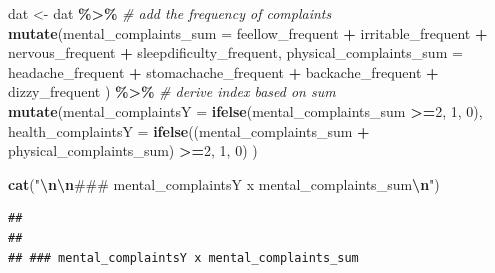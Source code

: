\documentclass[
]{article}
\newenvironment{Shaded}{\begin{snugshade}}{\end{snugshade}}
\newcommand{\AttributeTok}[1]{\textcolor[rgb]{0.13,0.29,0.53}{#1}}
\newcommand{\CommentTok}[1]{\textcolor[rgb]{0.56,0.35,0.01}{\textit{#1}}}
\newcommand{\DecValTok}[1]{\textcolor[rgb]{0.00,0.00,0.81}{#1}}
\newcommand{\FunctionTok}[1]{\textcolor[rgb]{0.13,0.29,0.53}{\textbf{#1}}}
\newcommand{\NormalTok}[1]{#1}
\newcommand{\OtherTok}[1]{\textcolor[rgb]{0.56,0.35,0.01}{#1}}
\newcommand{\SpecialCharTok}[1]{\textcolor[rgb]{0.81,0.36,0.00}{\textbf{#1}}}
\newcommand{\StringTok}[1]{\textcolor[rgb]{0.31,0.60,0.02}{#1}}
\begin{document}
\begin{Shaded}
\begin{Highlighting}[]
\NormalTok{dat }\OtherTok{\textless{}{-}}\NormalTok{ dat }\SpecialCharTok{\%\textgreater{}\%}
  \CommentTok{\# add the frequency of complaints}
  \FunctionTok{mutate}\NormalTok{(}\AttributeTok{mental\_complaints\_sum =}\NormalTok{ feellow\_frequent }\SpecialCharTok{+}
\NormalTok{                           irritable\_frequent }\SpecialCharTok{+}
\NormalTok{                           nervous\_frequent }\SpecialCharTok{+}
\NormalTok{                           sleepdificulty\_frequent,}
         \AttributeTok{physical\_complaints\_sum =}\NormalTok{ headache\_frequent }\SpecialCharTok{+}
\NormalTok{                           stomachache\_frequent }\SpecialCharTok{+}
\NormalTok{                           backache\_frequent }\SpecialCharTok{+} 
\NormalTok{                           dizzy\_frequent}
\NormalTok{  ) }\SpecialCharTok{\%\textgreater{}\%}
  \CommentTok{\# derive index based on sum}
  \FunctionTok{mutate}\NormalTok{(}\AttributeTok{mental\_complaintsY =} \FunctionTok{ifelse}\NormalTok{(mental\_complaints\_sum }\SpecialCharTok{\textgreater{}=}\DecValTok{2}\NormalTok{, }\DecValTok{1}\NormalTok{, }\DecValTok{0}\NormalTok{),}
         \AttributeTok{health\_complaintsY =} \FunctionTok{ifelse}\NormalTok{((mental\_complaints\_sum }\SpecialCharTok{+}\NormalTok{ physical\_complaints\_sum) }\SpecialCharTok{\textgreater{}=}\DecValTok{2}\NormalTok{, }\DecValTok{1}\NormalTok{, }\DecValTok{0}\NormalTok{)}
\NormalTok{      ) }

\FunctionTok{cat}\NormalTok{(}\StringTok{"}\SpecialCharTok{\textbackslash{}n\textbackslash{}n}\StringTok{\#\#\# mental\_complaintsY x mental\_complaints\_sum}\SpecialCharTok{\textbackslash{}n}\StringTok{"}\NormalTok{)}
\end{Highlighting}
\end{Shaded}

\begin{verbatim}
## 
## 
## ### mental_complaintsY x mental_complaints_sum
\end{verbatim}

\begin{Shaded}
\end{Shaded}
\end{document}
